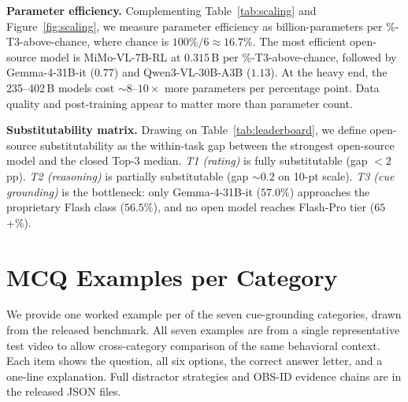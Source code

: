 \documentclass{article}
\begin{document}
\noindent\textbf{Parameter efficiency.}
Complementing Table~\ref{tab:scaling} and Figure~\ref{fig:scaling}, we measure parameter efficiency as billion-parameters per \%-T3-above-chance, where chance is $100\%/6\!\approx\!16.7\%$. The most efficient open-source model is MiMo-VL-7B-RL at $0.315$\,B per \%-T3-above-chance, followed by Gemma-4-31B-it ($0.77$) and Qwen3-VL-30B-A3B ($1.13$). At the heavy end, the 235--402\,B models cost $\sim\!8$--$10\!\times$ more parameters per percentage point. Data quality and post-training appear to matter more than parameter count.

\noindent\textbf{Substitutability matrix.}
Drawing on Table~\ref{tab:leaderboard}, we define open-source substitutability as the within-task gap between the strongest open-source model and the closed Top-3 median. \emph{T1 (rating)} is fully substitutable (gap $<\!2$\,pp). \emph{T2 (reasoning)} is partially substitutable (gap $\sim\!0.2$ on 10-pt scale). \emph{T3 (cue grounding)} is the bottleneck: only Gemma-4-31B-it ($57.0\%$) approaches the proprietary Flash class ($56.5\%$), and no open model reaches Flash-Pro tier ($65$+\%).

\section{MCQ Examples per Category}
\label{app:mcq}

We provide one worked example per of the seven cue-grounding categories, drawn from the released benchmark. All seven examples are from a single representative test video to allow cross-category comparison of the same behavioral context. Each item shows the question, all six options, the correct answer letter, and a one-line explanation. Full distractor strategies and OBS-ID evidence chains are in the released JSON files.
\end{document}
